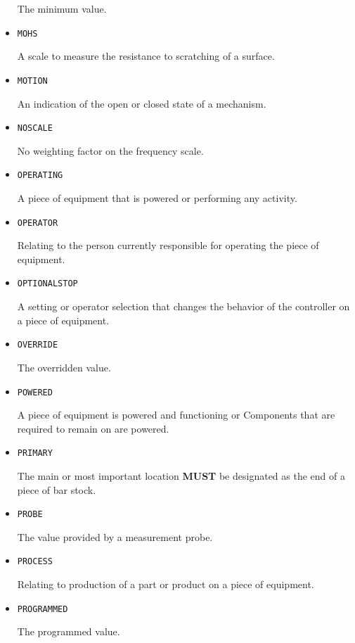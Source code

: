 \begin{itemize}
The minimum value.


\item \texttt{MOHS}  

A scale to measure the resistance to scratching of a surface.


\item \texttt{MOTION}  

An indication of the open or closed state of a mechanism.


\item \texttt{NO\textunderscore SCALE}  

No weighting factor on the frequency scale.


\item \texttt{OPERATING}  

A piece of equipment that is powered or performing any activity.


\item \texttt{OPERATOR}  

Relating to the person currently responsible for operating the piece of equipment.


\item \texttt{OPTIONAL\textunderscore STOP}  

A setting or operator selection that changes the behavior of the controller on a piece of equipment. 


\item \texttt{OVERRIDE}  

The overridden value.


\item \texttt{POWERED}  

A piece of equipment is powered and functioning or \glspl{Component} that are required to remain on are powered.


\item \texttt{PRIMARY}  

The main or most important location \textbf{MUST} be designated as the end of a piece of bar stock.


\item \texttt{PROBE}  

The value provided by a measurement probe.


\item \texttt{PROCESS}  

Relating to production of a part or product on a piece of equipment.


\item \texttt{PROGRAMMED}  

The programmed value.



\end{itemize}

